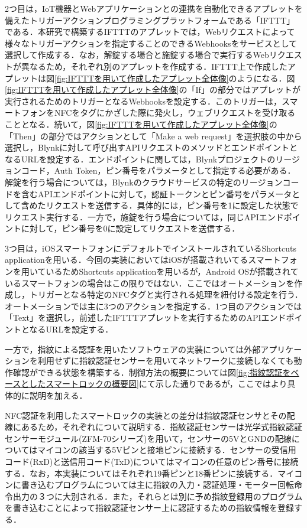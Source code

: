       \par 2つ目は，IoT機器とWebアプリケーションとの連携を自動化できるアプレットを備えたトリガーアクションプログラミングプラットフォームである「IFTTT」である．本研究で構築するIFTTTのアプレットでは，Webリクエストによって様々なトリガーアクションを指定することのできるWebhooksをサービスとして選択して作成する．なお，解錠する場合と施錠する場合で実行するWebリクエストが異なるため，それぞれ別のアプレットを作成する．IFTTT上で作成したアプレットは図\ref{fig:IFTTTを用いて作成したアプレット全体像}のようになる．図\ref{fig:IFTTTを用いて作成したアプレット全体像}の「If」の部分ではアプレットが実行されるためのトリガーとなるWebhooksを設定する．このトリガーは，スマートフォンをNFCをタグにかざした際に発火し，ウェブリクエストを受け取ることとなる．続いて，図\ref{fig:IFTTTを用いて作成したアプレット全体像}の「Then」の部分ではアクションとして「Make a web request」を選択肢の中から選択し，Blynkに対して呼び出すAPIリクエストのメソッドとエンドポイントとなるURLを設定する．エンドポイントに関しては，Blynkプロジェクトのリージョンコード，Auth Token，ピン番号をパラメータとして指定する必要がある．解錠を行う場合については，Blynkのクラウドサービスの特定のリージョンコードを含むAPIエンドポイントに対して，認証トークンとピン番号をパラメータとして含めたリクエストを送信する．具体的には，ピン番号を1に設定した状態でリクエスト実行する．一方で，施錠を行う場合については，同じAPIエンドポイントに対して，ピン番号を0に設定してリクエストを送信する．
      \par 3つ目は，iOSスマートフォンにデフォルトでインストールされているShortcuts applicationを用いる．今回の実装においてはiOSが搭載されいてるスマートフォンを用いているためShortcuts applicationを用いるが，Android OSが搭載されているスマートフォンの場合はこの限りではない．ここではオートメーションを作成し，トリガーとなる特定のNFCタグと実行される処理を紐付ける設定を行う．オートメーションでは主に3つのアクションを指定する．1つ目のアクションでは「Text」を選択し，前述したIFTTTアプレットを実行するためのAPIエンドポイントとなるURLを設定する．
      \par 一方で，指紋による認証を用いたソフトウェアの実装については外部アプリケーションを利用せずに指紋認証センサーを用いてネットワークに接続しなくても動作確認ができる状態を構築する．制御方法の概要については図\ref{fig:指紋認証をベースとしたスマートロックの概要図}にて示した通りであるが，ここではより具体的に説明を加える．
      \par NFC認証を利用したスマートロックの実装との差分は指紋認証センサとその配線にあるため，それぞれについて説明する．指紋認証センサーは光学式指紋認証センサーモジュール(ZFM-70シリーズ)を用いて，センサーの5VとGNDの配線についてはマイコンの該当する5Vピンと接地ピンに接続する．センサーの受信用コード(RxD)と送信用コード(TxD)についてはマイコンの任意のピン番号に接続する．なお，本実装についてはそれぞれ19番ピンと18番ピンに接続する．マイコンに書き込むプログラムについては主に指紋の入力・認証処理・モーター回転命令出力の３つに大別される．また，それらとは別に予め指紋登録用のプログラムを書き込むことによって指紋認証センサー上に認証するための指紋情報を登録する．
  

